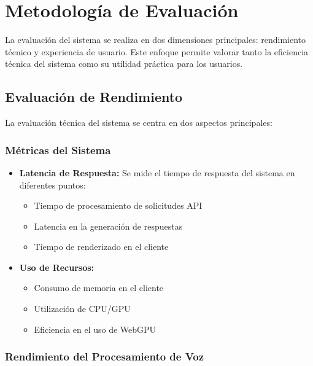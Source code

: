 \section{Metodología de Evaluación}
\label{metodologia-evaluacion}

La evaluación del sistema se realiza en dos dimensiones principales: rendimiento técnico y experiencia de usuario. Este enfoque permite valorar tanto la eficiencia técnica del sistema como su utilidad práctica para los usuarios.

\subsection{Evaluación de Rendimiento}
\label{evaluacion-rendimiento}

La evaluación técnica del sistema se centra en dos aspectos principales:

\subsubsection{Métricas del Sistema}

\begin{itemize}
	\item \textbf{Latencia de Respuesta:} Se mide el tiempo de respuesta del sistema en diferentes puntos:
	      \begin{itemize}
		      \item Tiempo de procesamiento de solicitudes API
		      \item Latencia en la generación de respuestas
		      \item Tiempo de renderizado en el cliente
	      \end{itemize}

	\item \textbf{Uso de Recursos:}
	      \begin{itemize}
		      \item Consumo de memoria en el cliente
		      \item Utilización de CPU/GPU
		      \item Eficiencia en el uso de WebGPU
	      \end{itemize}
\end{itemize}

\subsubsection{Rendimiento del Procesamiento de Voz}

